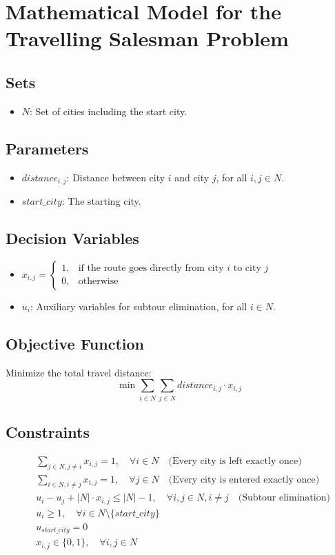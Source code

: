 \documentclass{article}
\begin{document}
\section*{Mathematical Model for the Travelling Salesman Problem}

\subsection*{Sets}
\begin{itemize}
    \item $N$: Set of cities including the start city.
\end{itemize}

\subsection*{Parameters}
\begin{itemize}
    \item $distance_{i,j}$: Distance between city $i$ and city $j$, for all $i, j \in N$.
    \item $start\_city$: The starting city.
\end{itemize}

\subsection*{Decision Variables}
\begin{itemize}
    \item $x_{i,j} = 
    \begin{cases} 
    1, & \text{if the route goes directly from city } i \text{ to city } j \\
    0, & \text{otherwise}
    \end{cases}$
    
    \item $u_i$: Auxiliary variables for subtour elimination, for all $i \in N$.
\end{itemize}

\subsection*{Objective Function}
Minimize the total travel distance:
\[
\min \sum_{i \in N} \sum_{j \in N} distance_{i,j} \cdot x_{i,j}
\]

\subsection*{Constraints}
\begin{align}
& \sum_{j \in N, j \ne i} x_{i,j} = 1, \quad \forall i \in N \quad \text{(Every city is left exactly once)} \\
& \sum_{i \in N, i \ne j} x_{i,j} = 1, \quad \forall j \in N \quad \text{(Every city is entered exactly once)} \\
& u_i - u_j + |N| \cdot x_{i,j} \leq |N| - 1, \quad \forall i, j \in N, i \ne j \quad \text{(Subtour elimination)} \\
& u_i \geq 1, \quad \forall i \in N \setminus \{start\_city\} \\
& u_{start\_city} = 0 \\
& x_{i,j} \in \{0, 1\}, \quad \forall i, j \in N
\end{align}
\end{document}

